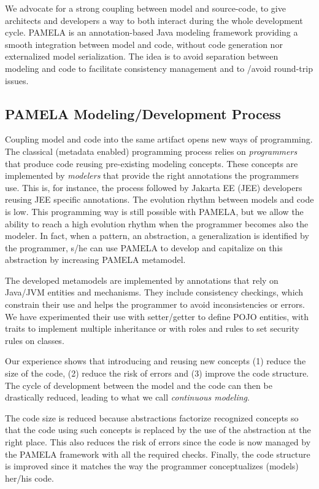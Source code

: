 We advocate for a strong coupling between model and source-code, to give architects and developers a way to both interact during the whole development cycle. PAMELA is an annotation-based Java modeling framework providing a smooth integration between model and code, without code generation nor externalized model serialization. The idea is to avoid separation between modeling and code to facilitate consistency management and to /avoid round-trip issues.

\subsection{PAMELA Modeling/Development Process}

Coupling model and code into the same artifact opens new ways of programming. The classical (metadata enabled) programming process relies on \emph{programmers} that produce code reusing pre-existing modeling concepts. These concepts are implemented by \emph{modelers} that provide the right annotations the programmers use. This is, for instance, the process followed by Jakarta EE (JEE) developers reusing JEE specific annotations. The evolution rhythm between models and code is low. This programming way is still possible with PAMELA, but we allow the ability to reach a high evolution rhythm when the programmer becomes also the modeler. In fact, when a pattern, an abstraction, a generalization is identified by the programmer, s/he can use PAMELA to develop and capitalize on this abstraction by increasing PAMELA metamodel. 


The developed metamodels are implemented by annotations that rely on Java/JVM entities and mechanisms. They include consistency checkings, which constrain their use and helps the programmer to avoid inconsistencies or errors. We have experimented their use with setter/getter to define POJO entities, with traits to implement multiple inheritance or with roles and rules to set security rules on classes.

Our experience shows that introducing and reusing new concepts (1) reduce the size of the code, (2) reduce the risk of errors and (3) improve the code structure. The cycle of development between the model and the code can then be drastically reduced, leading to what we call \emph{continuous modeling}.

The code size is reduced because abstractions factorize recognized concepts so that the code using such concepts is replaced by the use of the abstraction at the right place. This also reduces the risk of errors since the code is now managed by the PAMELA framework with all the required checks. Finally, the code structure is improved since it matches the way the programmer conceptualizes (models) her/his code. 

